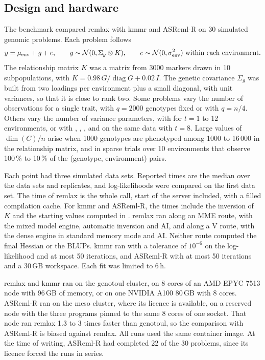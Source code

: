 \documentclass[article,nojss]{jss}
\renewcommand{\pkg}[1]{#1}
\newcommand{\diag}{\operatorname{diag}}
\newcommand{\dimC}{\operatorname{dim}}
\begin{document}
\subsection{Design and hardware}

The benchmark compared \pkg{remlax} with \pkg{kmmr} \citep{melsen2026} and
\pkg{ASReml-R} on 30 simulated genomic problems. Each problem follows
\begin{equation}\label{eq:simmodel}
  y = \mu_{\rm env} + g + e, \qquad g \sim \mathcal{N}(0, \Sigma_g \otimes K),
  \qquad e \sim \mathcal{N}(0, \sigma^2_{\rm env}) \text{ within each
  environment}.
\end{equation}
The relationship matrix $K$ was a \citet{vanraden2008} matrix from 3000
markers drawn in 10 subpopulations, with $K = 0.98\,G/\overline{\diag G} +
0.02\,I$. The genetic covariance $\Sigma_g$ was built from two loadings per
environment plus a small diagonal, with unit variances, so that it is close to
rank two. Some problems vary the number of observations for a single trait,
with $q = 2000$ genotypes fixed or with $q = n/4$. Others vary the number of
variance parameters, with  for $t = 1$ to 12 environments, or with
, , ,  and  on the same data
with $t = 8$. Large values of $\dimC(C)/n$ arise when 1000 genotypes are
phenotyped among 1000 to 16\,000 in the relationship matrix, and in sparse
 trials over 10 environments that observe 100\,\% to 10\,\% of
the (genotype, environment) pairs.

Each point had three simulated data sets. Reported times are the median over
the data sets and replicates, and log-likelihoods were compared on the first
data set. The time of \pkg{remlax} is the whole  call, start of
the  server included, with a filled compilation cache. For
\pkg{kmmr} and \pkg{ASReml-R}, the times include the inversion of $K$ and the
starting values computed in . \pkg{remlax} ran along an MME route,
with the mixed model engine, automatic inversion and AI, and along a V route,
with the dense engine in standard memory mode and AI. Neither route computed
the final Hessian or the BLUPs. \pkg{kmmr} ran
with a tolerance of $10^{-6}$ on the log-likelihood and at most 50 iterations,
and \pkg{ASReml-R} with at most 50 iterations and a 30\,GB workspace. Each fit
was limited to 6\,h.

\pkg{remlax} and \pkg{kmmr} ran on the genotoul cluster, on 8 cores of an AMD
EPYC 7513 node with 96\,GB of memory, or on one NVIDIA A100 80\,GB with 8 cores.
\pkg{ASReml-R} ran on the meso cluster, where its licence is available, on a
reserved node with the three programs pinned to the same 8 cores of one socket.
That node ran \pkg{remlax} 1.3 to 3 times faster than genotoul, so the
comparison with \pkg{ASReml-R} is biased against \pkg{remlax}. All runs used
the same container image.
At the time of writing, \pkg{ASReml-R} had completed 22 of the 30 problems,
since its licence forced the runs in series.
\end{document}
